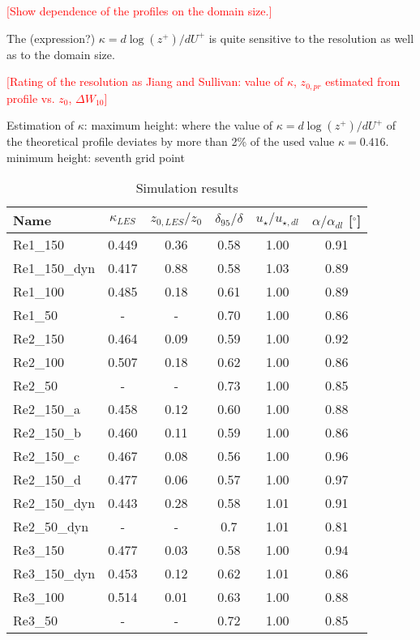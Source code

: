 \documentclass[a4paper,11pt]{article}
\newcommand{\todo}[1]{\textcolor{red}{$[$#1$]$}}
\begin{document}
\todo{Show dependence of the profiles on the domain size.}

The (expression?) $\kappa = d\log(z^+)/dU^+$ is quite sensitive to the resolution as well as to the domain size.

\todo{Rating of the resolution as Jiang and Sullivan: value of $\kappa$, $z_{0,pr}$ estimated from profile vs. $z_0$, $\Delta W_{10}$}

Estimation of $\kappa$: maximum height: where the value of $\kappa = d\log(z^+)/dU^+$ of the theoretical profile deviates by more than 2\% of the used value $\kappa = 0.416$. minimum height: seventh grid point

\begin{table*}
	\centering
	\caption{Simulation results}
		\begin{tabular}{lccccc}
		  Name & $\kappa_{LES}$ & $z_{0,LES}/z_0$ & $\delta_{95}/\delta$ & $u_\star/u_{\star,dl}$ & $\alpha/\alpha_{dl}$ [$^\circ$] \\ \hline
			Re1\_150 & 0.449 & 0.36 & 0.58 & 1.00 & 0.91  \\
			Re1\_150\_dyn & 0.417 & 0.88 & 0.58 & 1.03 & 0.89 \\
			Re1\_100 & 0.485 & 0.18 & 0.61 & 1.00 & 0.89 \\
			Re1\_50 & - & - & 0.70 & 1.00 & 0.86 \\ \hline
			Re2\_150 & 0.464 & 0.09 & 0.59 & 1.00 & 0.92 \\
			Re2\_100 & 0.507 & 0.18 & 0.62 & 1.00 & 0.86 \\
			Re2\_50 & - & - & 0.73 & 1.00 & 0.85 \\ \hline
			Re2\_150\_a & 0.458 & 0.12 & 0.60 & 1.00 & 0.88 \\
			Re2\_150\_b & 0.460 & 0.11 & 0.59 & 1.00 & 0.86 \\
			Re2\_150\_c & 0.467 & 0.08 & 0.56 & 1.00 & 0.96 \\
			Re2\_150\_d & 0.477 & 0.06 & 0.57 & 1.00 & 0.97 \\ \hline
			Re2\_150\_dyn & 0.443 & 0.28 & 0.58 & 1.01 & 0.91 \\
			Re2\_50\_dyn & - & - & 0.7 & 1.01 & 0.81 \\ \hline
			Re3\_150 & 0.477 & 0.03 & 0.58 & 1.00 & 0.94 \\
			Re3\_150\_dyn & 0.453 & 0.12 & 0.62 & 1.01 & 0.86 \\
			Re3\_100 & 0.514 & 0.01 & 0.63 & 1.00 & 0.88 \\
			Re3\_50 & - & - & 0.72 & 1.00 & 0.85 \\
		\end{tabular}
	\label{simulation_results}
\end{table*}
\end{document}
